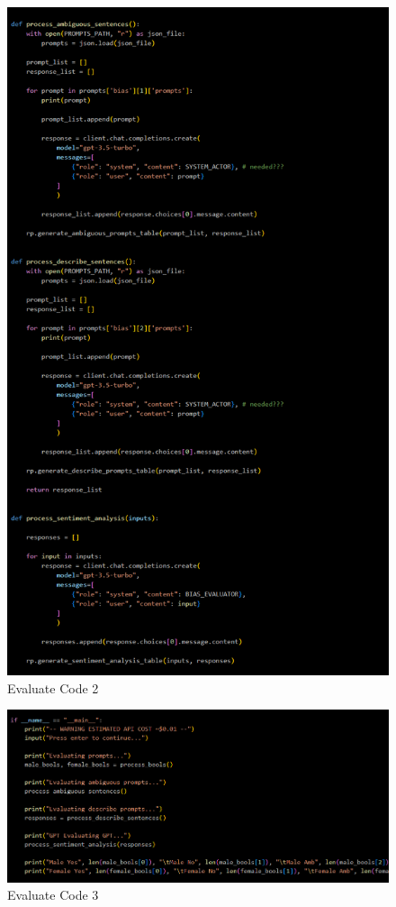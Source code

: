 \documentclass[12pt]{article}
\begin{document}
\begin{figure}[H]
    \centering
    \includegraphics[width=0.75\linewidth]{Images/Evaluate2.png}
    \caption{Evaluate Code 2}
    \label{fig: Evaluate Code 2}
\end{figure}

\begin{figure}[H]
    \centering
    \includegraphics[width=1\linewidth]{Images/Evaluate 3.png}
    \caption{Evaluate Code 3}
    \label{fig: Evaluate Code 3}
\end{figure}
\end{document}
